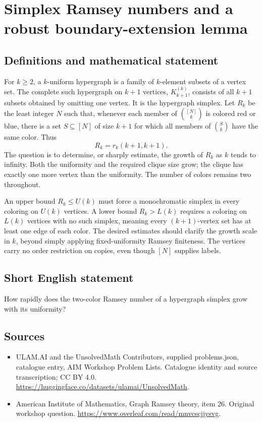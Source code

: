\documentclass[11pt,a4paper]{article}
\begin{document}
\section*{Simplex Ramsey numbers and a robust boundary-extension lemma}\label{statement}

\subsection{Definitions and mathematical statement}
For $k\ge2$, a $k$-uniform hypergraph is a family of $k$-element
subsets of a vertex set. The complete such hypergraph on $k+1$
vertices, $K_{k+1}^{(k)}$, consists of all $k+1$ subsets obtained by
omitting one vertex. It is the hypergraph simplex.
Let $R_k$ be the least integer $N$ such that, whenever each member of
$\binom{[N]}k$ is colored red or blue, there is a set
$S\subseteq[N]$ of size $k+1$ for which all members of
$\binom Sk$ have the same color. Thus
\[
                        R_k=r_k(k+1,k+1).
\]
The question is to determine, or sharply estimate, the growth of $R_k$
as $k$ tends to infinity. Both the uniformity and the required clique
size grow; the clique has exactly one more vertex than the uniformity.
The number of colors remains two throughout.

An upper bound $R_k\le U(k)$ must force a monochromatic simplex in
every coloring on $U(k)$ vertices. A lower bound $R_k>L(k)$ requires
a coloring on $L(k)$ vertices with no such simplex, meaning every
$(k+1)$-vertex set has at least one edge of each color.
The desired estimates should clarify the growth scale in $k$, beyond
simply applying fixed-uniformity Ramsey finiteness. The vertices carry
no order restriction on copies, even though $[N]$ supplies labels.
\subsection{Short English statement}
How rapidly does the two-color Ramsey number of a hypergraph simplex grow with its uniformity?
\subsection{Sources}
\begin{itemize}
\item[S1] ULAM.AI and the UnsolvedMath Contributors, supplied problems.json, catalogue entry, AIM Workshop Problem Lists. Catalogue identity and source transcription; CC BY 4.0.
\url{https://huggingface.co/datasets/ulamai/UnsolvedMath}.
\item[S2] American Institute of Mathematics, Graph Ramsey theory, item 26. Original workshop question.
\url{https://www.overleaf.com/read/mnvcscjjysvg}.
\end{itemize}
\end{document}
